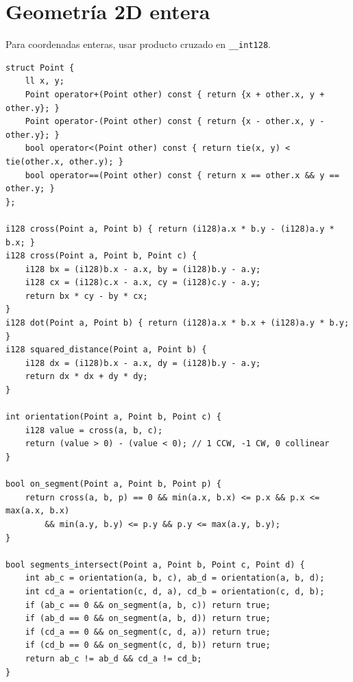 \section{Geometr\'ia 2D entera}

Para coordenadas enteras, usar producto cruzado en \texttt{\_\_int128}.

\begin{lstlisting}[style=cpp]
struct Point {
    ll x, y;
    Point operator+(Point other) const { return {x + other.x, y + other.y}; }
    Point operator-(Point other) const { return {x - other.x, y - other.y}; }
    bool operator<(Point other) const { return tie(x, y) < tie(other.x, other.y); }
    bool operator==(Point other) const { return x == other.x && y == other.y; }
};

i128 cross(Point a, Point b) { return (i128)a.x * b.y - (i128)a.y * b.x; }
i128 cross(Point a, Point b, Point c) {
    i128 bx = (i128)b.x - a.x, by = (i128)b.y - a.y;
    i128 cx = (i128)c.x - a.x, cy = (i128)c.y - a.y;
    return bx * cy - by * cx;
}
i128 dot(Point a, Point b) { return (i128)a.x * b.x + (i128)a.y * b.y; }
i128 squared_distance(Point a, Point b) {
    i128 dx = (i128)b.x - a.x, dy = (i128)b.y - a.y;
    return dx * dx + dy * dy;
}

int orientation(Point a, Point b, Point c) {
    i128 value = cross(a, b, c);
    return (value > 0) - (value < 0); // 1 CCW, -1 CW, 0 collinear
}

bool on_segment(Point a, Point b, Point p) {
    return cross(a, b, p) == 0 && min(a.x, b.x) <= p.x && p.x <= max(a.x, b.x)
        && min(a.y, b.y) <= p.y && p.y <= max(a.y, b.y);
}

bool segments_intersect(Point a, Point b, Point c, Point d) {
    int ab_c = orientation(a, b, c), ab_d = orientation(a, b, d);
    int cd_a = orientation(c, d, a), cd_b = orientation(c, d, b);
    if (ab_c == 0 && on_segment(a, b, c)) return true;
    if (ab_d == 0 && on_segment(a, b, d)) return true;
    if (cd_a == 0 && on_segment(c, d, a)) return true;
    if (cd_b == 0 && on_segment(c, d, b)) return true;
    return ab_c != ab_d && cd_a != cd_b;
}
\end{lstlisting}


